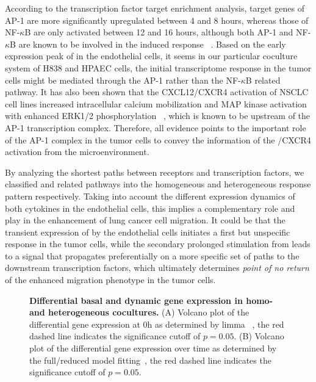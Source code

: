 \begin{itemize}
According to the transcription factor target enrichment analysis, target genes
of AP-1 are more significantly upregulated between 4 and 8 hours, whereas those
of NF-$\kappa$B are only activated between 12 and 16 hours, although both AP-1 and
NF-$\kappa$B are known to be involved in the \tnfa induced response~%
\cite{Kulbe2005}. Based on 
the early expression peak of \tnfa in the endothelial cells, it seems
in our particular coculture system of H838 and HPAEC cells, the initial 
transcriptome response in the tumor cells might be mediated through the AP-1
rather than the NF-$\kappa$B related pathway. It has also been
shown that the CXCL12/CXCR4 activation of NSCLC cell lines 
increased intracellular calcium mobilization and MAP kinase 
activation with enhanced ERK1/2 phosphorylation~%
\cite{Belperio2004}, which is 
known to be upstream of the AP-1 transcription complex.
Therefore, all evidence points to the important role of the
AP-1 complex in the tumor cells to convey the information of  
the \sdfonea/CXCR4 activation from the microenvironment.

By analyzing the shortest paths between receptors and transcription factors, 
we classified \tnfa and \sdfonea related 
pathways into the homogeneous and
heterogeneous response pattern respectively. Taking into account the different
expression dynamics of both cytokines in the endothelial cells, this implies a
complementary role \tnfa and \sdfonea play in the enhancement of lung cancer
cell migration. It could be that the transient expression of \tnfa by the 
endothelial cells initiates a first but unspecific response in the tumor cells,
while the secondary prolonged stimulation from \sdfonea leads to a signal that 
propagates preferentially 
on a more specific set of paths to the downstream transcription factors, which
ultimately determines \emph{point of no return} of the enhanced migration phenotype 
in the tumor cells.

\end{itemize}



\begin{figure}[!ht]
\caption{
{\bf Differential basal and dynamic gene expression in homo- and heterogeneous 
cocultures.} 
(A) Volcano plot of the differential gene expression at 0h as determined by limma~%
\cite{Smyth2004}, the red dashed line
indicates the significance cutoff of $p = 0.05$.
(B) Volcano plot of the differential gene expression over time as determined by the
full/reduced model fitting~\cite{Mar2009}, the red dashed line
indicates the significance cutoff of $p = 0.05$.
}
\label{fig:transcriptome}
\end{figure}

